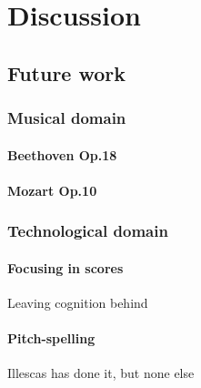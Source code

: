 \chapter{Discussion}

\section{Future work}
  \subsection{Musical domain}
    \subsubsection{Beethoven Op.18}
    \subsubsection{Mozart Op.10}
  \subsection{Technological domain}
    \subsubsection{Focusing in scores}
    Leaving cognition behind
    \subsubsection{Pitch-spelling}
    Illescas has done it, but none else

\newpage
